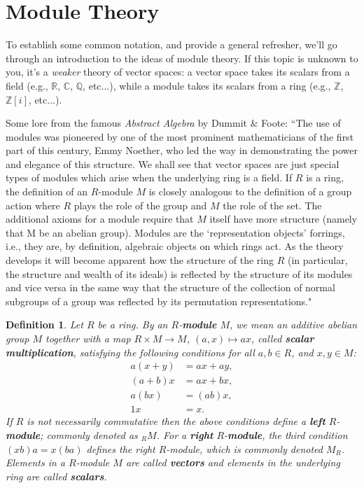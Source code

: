 \documentclass[12pt,reqno]{amsart}
\theoremstyle{plain}
\newtheorem{defi}{Definition}
\newcommand{\rr}{\mathbb R}
\newcommand{\cc}{\mathbb C}
\newcommand{\zz}{\mathbb Z}
\newcommand{\qq}{\mathbb Q}
\begin{document}
\section{Module Theory}

To establish some common notation, and provide a general refresher, we'll go through an introduction to the ideas of module theory. If this topic is unknown to you, it's a \textit{weaker} theory of vector spaces: a vector space takes its scalars from a field (e.g., $\rr$, $\cc$, $\qq$, etc...), while a module takes its scalars from a ring (e.g., $\zz$, $\zz [i]$, etc...).

Some lore from the famous \textit{Abstract Algebra} by Dummit $\&$ Foote: ``The use of modules was pioneered by one of the most prominent mathematicians of the first part of this century, Emmy Noether, who led the way in demonstrating the power and elegance of this structure. We shall see that vector spaces are just special types of modules which arise when the underlying ring is a field. If $R$ is a ring, the definition of an $R$-module $M$ is closely analogous to the definition of a group action where $R$ plays the role of the group and $M$ the role of the set. The additional axioms for a module require that $M$ itself have more structure (namely that M be an abelian group). Modules are the `representation objects' forrings, i.e., they are, by definition, algebraic objects on which rings act. As the theory develops it will become apparent how the structure of the ring $R$ (in particular, the structure and wealth of its ideals) is reflected by the structure of its modules and vice versa in the same way that the structure of the collection of normal subgroups of a group was reflected by its permutation representations."

\begin{defi} Let $R$ be a ring. By an $R$-\textbf{module} $M$, we mean an additive abelian group $M$ together with a map $R \times M \to M$, $(a, x) \mapsto ax$, called \textbf{scalar multiplication}, satisfying the following conditions for all $a, b \in R$, and $x, y \in M$: 
\begin{align*}
a(x+y) & = ax + ay,  \\
(a+b) x &= ax + bx, \\
a(bx) &= (ab)x, \\
1x &= x.
\end{align*}
If $R$ is not necessarily commutative then the above conditions define a \textbf{left} $R$-\textbf{module}; commonly denoted as $_R M$.  For a \textbf{right} $R$-\textbf{module}, the third condition $(xb)a = x(ba)$ defines the right $R$-module, which is commonly denoted $M_R$. Elements in a $R$-module $M$ are called \textbf{vectors} and elements in the underlying ring are called \textbf{scalars}. 
\end{defi} 
\end{document}
